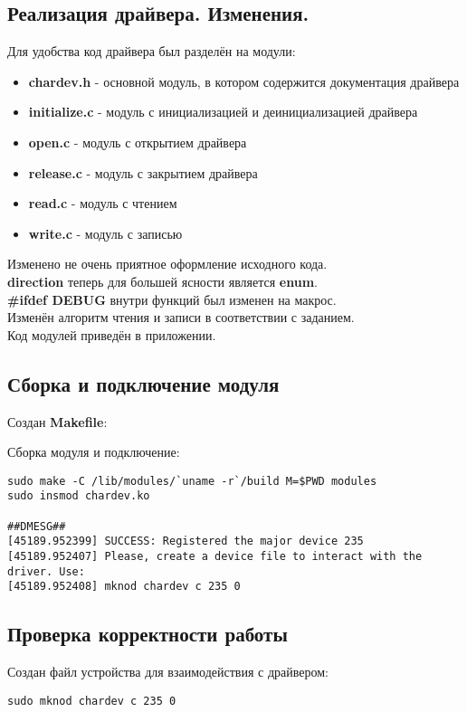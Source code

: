 \documentclass[a4paper,11pt]{article}
\begin{document}
  \subsection{Реализация драйвера. Изменения.}
    Для удобства код драйвера был разделён на модули:
    \begin{itemize}
      \item \textbf{chardev.h} - основной модуль, в котором содержится документация драйвера
      \item \textbf{initialize.c} - модуль с инициализацией и деинициализацией драйвера
      \item \textbf{open.c} - модуль с открытием драйвера
      \item \textbf{release.c} - модуль с закрытием драйвера
      \item \textbf{read.c} - модуль с чтением
      \item \textbf{write.c} - модуль с записью \\
    \end{itemize}
    
    Изменено не очень приятное оформление исходного кода. \\
    \textbf{direction} теперь для большей ясности является \textbf{enum}. \\
    \textbf{\#ifdef DEBUG} внутри функций был изменен на макрос. \\
    Изменён алгоритм чтения и записи в соответствии с заданием. \\
    Код модулей приведён в приложении.

  \subsection{Сборка и подключение модуля}
    Создан \textbf{Makefile}:
    

    Сборка модуля и подключение:
    \begin{lstlisting}
sudo make -C /lib/modules/`uname -r`/build M=$PWD modules
sudo insmod chardev.ko

##DMESG##
[45189.952399] SUCCESS: Registered the major device 235
[45189.952407] Please, create a device file to interact with the driver. Use:
[45189.952408] mknod chardev c 235 0
    \end{lstlisting}
    \newpage

  \subsection{Проверка корректности работы}
    Создан файл устройства для взаимодействия с драйвером:
    \begin{lstlisting}
sudo mknod chardev c 235 0
    \end{lstlisting}
\end{document}
